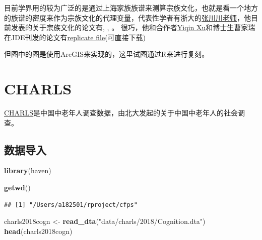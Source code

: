\documentclass[
]{book}
\newenvironment{Shaded}{\begin{snugshade}}{\end{snugshade}}
\newcommand{\FunctionTok}[1]{\textcolor[rgb]{0.13,0.29,0.53}{\textbf{#1}}}
\newcommand{\NormalTok}[1]{#1}
\newcommand{\OtherTok}[1]{\textcolor[rgb]{0.56,0.35,0.01}{#1}}
\newcommand{\StringTok}[1]{\textcolor[rgb]{0.31,0.60,0.02}{#1}}
\begin{document}
目前学界用的较为广泛的是通过上海家族族谱来测算宗族文化，也就是看一个地方的族谱的密度来作为宗族文化的代理变量，代表性学者有浙大的\href{https://scholar.google.com/citations?user=_YWE1C4AAAAJ\&hl=en\&oi=ao}{张川川老师}，他目前发表的关于宗族文化的论文有\citep{Cao2022}, \citep{ZHANG2020100}, \citep{ZhangKawagawa2017}。
很巧，他和合作者\href{https://yiqingxu.org/}{Yiqin Xu}和博士生曹家瑞在JDE刊发的论文有\href{https://yiqingxu.org/papers/english/2022_famine/replication.zip}{replicate file}(可直接下载)

但图中的图是使用ArcGIS来实现的，这里试图通过R来进行复刻。

\hypertarget{charls}{%
\chapter{CHARLS}\label{charls}}

\href{http://charls.pku.edu.cn/}{CHARLS}是中国中老年人调查数据，由北大发起的关于中国中老年人的社会调查。

\hypertarget{ux6570ux636eux5bfcux5165}{%
\section{数据导入}\label{ux6570ux636eux5bfcux5165}}

\begin{Shaded}
\begin{Highlighting}[]
\FunctionTok{library}\NormalTok{(haven)}
\end{Highlighting}
\end{Shaded}

\begin{Shaded}
\begin{Highlighting}[]
\FunctionTok{getwd}\NormalTok{()}
\end{Highlighting}
\end{Shaded}

\begin{verbatim}
## [1] "/Users/a182501/rproject/cfps"
\end{verbatim}

\begin{Shaded}
\begin{Highlighting}[]
\NormalTok{charls2018cogn }\OtherTok{\textless{}{-}} \FunctionTok{read\_dta}\NormalTok{(}\StringTok{"data/charls/2018/Cognition.dta"}\NormalTok{)}
\FunctionTok{head}\NormalTok{(charls2018cogn)}
\end{Highlighting}
\end{Shaded}
\end{document}

